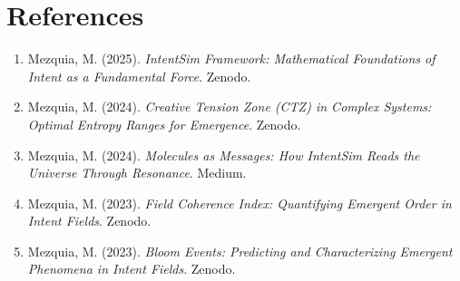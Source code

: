 \documentclass[12pt]{article}
\begin{document}
\section*{References}
\begin{enumerate}
  \item Mezquia, M. (2025). \textit{IntentSim Framework: Mathematical Foundations of Intent as a Fundamental Force}. Zenodo.
  \item Mezquia, M. (2024). \textit{Creative Tension Zone (CTZ) in Complex Systems: Optimal Entropy Ranges for Emergence}. Zenodo.
  \item Mezquia, M. (2024). \textit{Molecules as Messages: How IntentSim Reads the Universe Through Resonance}. Medium.
  \item Mezquia, M. (2023). \textit{Field Coherence Index: Quantifying Emergent Order in Intent Fields}. Zenodo.
  \item Mezquia, M. (2023). \textit{Bloom Events: Predicting and Characterizing Emergent Phenomena in Intent Fields}. Zenodo.
\end{enumerate}
\end{document}
